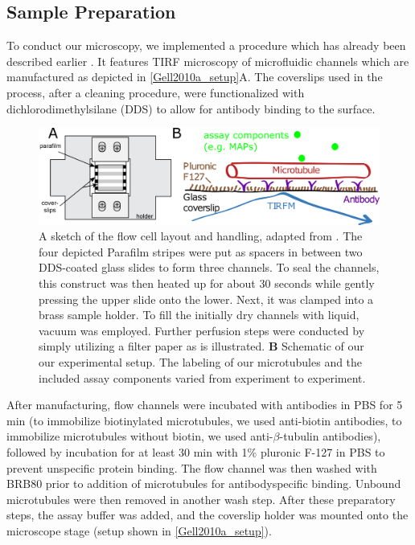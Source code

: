 \subsection{Sample Preparation}
\label{assayPREP}
To conduct our microscopy, we implemented a procedure which has already been described earlier \parencite{Gell2010a}. It features TIRF microscopy of microfluidic channels which are manufactured as depicted in \autoref{Gell2010a_setup}A. The coverslips used in the process, after a cleaning procedure, were functionalized with dichlorodimethylsilane (DDS) to allow for antibody binding to the surface.
\begin{figure}[htb]
\centering
\includegraphics[scale=1.1]{Figures/setup.png}
\caption[The flow cell layout and handling, adapted from \parencite{Gell2010a}]{
		A sketch of the flow cell layout and handling, adapted from \parencite{Gell2010a}. The four depicted Parafilm stripes were put as spacers in between two DDS-coated glass slides to form three channels. To seal the channels, this construct was then heated up for about 30 seconds while gently pressing the upper slide onto the lower. Next, it was clamped into a brass sample holder. To fill the initially dry channels with liquid, vacuum was employed. Further perfusion steps were conducted by simply utilizing a filter paper as is illustrated. \textbf{B} Schematic of our our experimental setup. The labeling of our microtubules and the included assay components varied from experiment to experiment. 
	}\label{Gell2010a_setup}
\end{figure}
After manufacturing, flow channels were incubated with antibodies in PBS for 5 min (to immobilize biotinylated microtubules, we used anti-biotin antibodies, to immobilize microtubules without biotin, we used anti-$\beta$-tubulin antibodies), followed by incubation for at least 30 min with 1\% pluronic F-127 in PBS to prevent unspecific protein binding. The flow channel was then washed with BRB80 prior to addition of microtubules for antibodyspecific binding. Unbound microtubules were then removed in another wash step. After these preparatory steps, the assay buffer was added, and the coverslip holder was mounted onto the microscope stage (setup shown in \autoref{Gell2010a_setup}).

